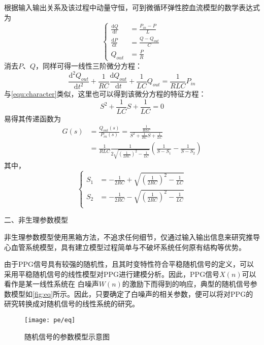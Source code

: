 根据输入输出关系及该过程中动量守恒，可到微循环弹性腔血流模型的数学表达式为
\begin{equation}
    \label{equ:wxh1}
    \left \{
    \begin{aligned}
        \frac{\mathrm{d} Q}{\mathrm{d} t} &=\frac{P_{in}-P}{L}\\
        \frac{\mathrm{d} P}{\mathrm{d} t} &=\frac{Q-Q_{out}}{C}\\
        Q_{out} &=\frac{P}{R}
    \end{aligned}
    \right.
\end{equation}
消去$P$、$Q$，同样可得一线性三阶微分方程：
\begin{equation}
    \label{equ:wxh2}
    \frac{\mathrm{d^2} Q_{out}}{\mathrm{d} t^2}+\frac{1}{RC}\frac{\mathrm{d} Q_{out}}{\mathrm{d} t}+\frac{1}{LC}Q_{out}=\frac{1}{RLC}P_{in}
\end{equation}
与\autoref{equ:character}类似，这里也可以得到该微分方程的特征方程：
\begin{equation}
    \label{equ:character2}
    S^2+\frac{1}{LC}S+\frac{1}{LC}=0
\end{equation}
易得其传递函数为
\begin{equation}
    \label{equ:hs}
    \begin{aligned}
    G(s) &=\frac{Q_{out}(s)}{P_{in}(s)}=\frac{\frac{1}{RLC}}{S^2+\frac{1}{RC}S+\frac{1}{LC}} \\
    &=\frac{1}{RLC}\frac{1}{2\sqrt{(\frac{1}{2RC})^2-\frac{1}{LC}}}(\frac{1}{S-S_{1}}-\frac{1}{S-S_{2}})
    \end{aligned}
\end{equation}
其中，
\begin{equation}
    \label{equ:ss}
    \left \{
    \begin{aligned}
        S_{1} &= -\frac{1}{2RC}+\sqrt{(\frac{1}{2RC})^2-\frac{1}{LC}}\\
        S_{2} &= -\frac{1}{2RC}-\sqrt{(\frac{1}{2RC})^2-\frac{1}{LC}}\\
    \end{aligned}
    \right.
\end{equation}

二、非生理参数模型

非生理参数模型使用黑箱方法，不追求任何细节，仅通过输入输出信息来研究推导心血管系统模型，具有建立模型过程简单与不破坏系统任何原有结构等优势。

由于PPG信号具有较强的随机性，且其时变特性符合平稳随机信号的定义，可以采用平稳随机信号的线性模型对PPG进行建模分析\cite{Qiu2012,PPGYY,Ma2015}。因此，PPG信号$X(n)$可以看作是某一线性系统在
白噪声$W(n)$的激励下而得到的响应，典型的随机信号参数模型如\autoref{fig:eq}所示。因此，只要确定了白噪声的相关参数，便可以将对PPG的研究转换成对随机信号的线性系统的研究。
\begin{figure}[htbp]
    \centering
    \texttt{[image: pe/eq]}
    \caption{\label{fig:eq}随机信号的参数模型示意图}
\end{figure}

